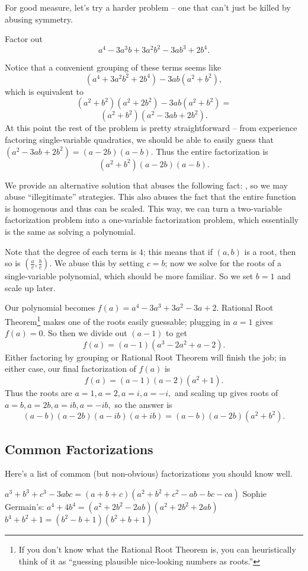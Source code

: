 \documentclass{article}
\begin{document}
For good measure, let's try a harder problem -- one that can't just be killed by abusing symmetry.

\begin{exam}
Factor out
\[a^4-3a^3b+3a^2b^2-3ab^3+2b^4.\]
\end{exam}

\begin{sol}[1]
Notice that a convenient grouping of these terms seems like
\[(a^4+3a^2b^2+2b^4)-3ab(a^2+b^2),\]
which is equivalent to
\[(a^2+b^2)(a^2+2b^2)-3ab(a^2+b^2)=\]
\[(a^2+b^2)(a^2-3ab+2b^2).\]
At this point the rest of the problem is pretty straightforward -- from experience factoring single-variable quadratics, we should be able to easily guess that $(a^2-3ab+2b^2)=(a-2b)(a-b).$ Thus the entire factorization is
\[(a^2+b^2)(a-2b)(a-b).\]
\end{sol}

We provide an alternative solution that abuses the following fact: , so we may abuse ``illegitimate'' strategies. This also abuses the fact that the entire function is homogenous and thus can be scaled. This way, we can turn a two-variable factorization problem into a one-variable factorization problem, which essentially is the same as solving a polynomial.

\begin{sol}[2]
Note that the degree of each term is $4$; this means that if $(a,b)$ is a root, then so is $(\frac{a}{c},\frac{b}{c}).$ We abuse this by setting $c=b$; now we solve for the roots of a single-variable polynomial, which should be more familiar. So we set $b=1$ and scale up later.

Our polynomial becomes $f(a)=a^4-3a^3+3a^2-3a+2.$ Rational Root Theorem\footnote{If you don't know what the Rational Root Theorem is, you can heuristically think of it as ``guessing plausible nice-looking numbers as roots.''} makes one of the roots easily guessable; plugging in $a=1$ gives $f(a)=0.$ So then we divide out $(a-1)$ to get
\[f(a)=(a-1)(a^3-2a^2+a-2).\]
Either factoring by grouping or Rational Root Theorem will finish the job; in either case, our final factorization of $f(a)$ is
\[f(a)=(a-1)(a-2)(a^2+1).\]
Thus the roots are $a=1,a=2,a=i,a=-i,$ and scaling up gives roots of $a=b,a=2b,a=ib,a=-ib,$ so the answer is
\[(a-b)(a-2b)(a-ib)(a+ib)=(a-b)(a-2b)(a^2+b^2).\]
\end{sol}

\subsection{Common Factorizations}
Here's a list of common (but non-obvious) factorizations you should know well.
\begin{fact}\hfill
\begin{itemize}
     \Item $a^3+b^3+c^3-3abc=(a+b+c)(a^2+b^2+c^2-ab-bc-ca)$
     \Item Sophie Germain's: $a^4+4b^4=(a^2+2b^2-2ab)(a^2+2b^2+2ab)$
     \Item $b^4+b^2+1=(b^2-b+1)(b^2+b+1)$
\end{itemize}
\end{fact}
\end{document}
